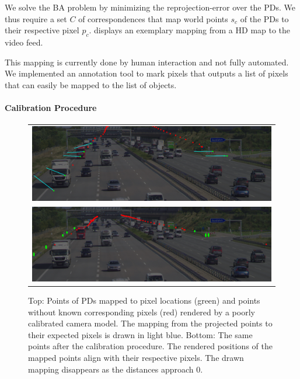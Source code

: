 We solve the BA problem by minimizing the reprojection-error over the PDs.
We thus require a set $C$ of correspondences that map world points $s_c$ of the PDs to their respective pixel $p_c$. 
 displays an exemplary mapping from a HD map to the video feed.

This mapping is currently done by human interaction and not fully automated. 
We implemented an annotation tool to mark pixels that outputs a list of pixels that can easily be mapped to the list of objects.


\paragraph{Calibration Procedure}
\begin{figure}[t]
  \centering
  \begin{tabular}{c}
    \includegraphics[width=0.95\linewidth]{images/calibration/background_uncalibrated_with_mapping.png}    \\
    \includegraphics[width=0.95\linewidth]{images/calibration/background_calibrated.png}    
  \end{tabular}
  \caption{
    Top: Points of PDs mapped to pixel locations (green) and points without known corresponding pixels (red) rendered by a poorly calibrated camera model.
    The mapping from the projected points to their expected pixels is drawn in light blue.
    Bottom: The same points after the calibration procedure.
    The rendered positions of the mapped points align with their respective pixels.
    The drawn mapping disappears as the distances approach $0$.
   }
  \label{fig:static_calibration_calibration}
\end{figure}
  
